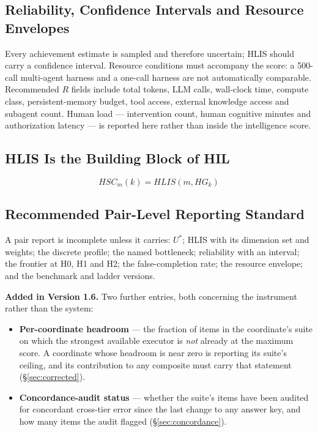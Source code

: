 \documentclass[11pt]{article}
\theoremstyle{definition}
\begin{document}
\subsection{Reliability, Confidence Intervals and Resource Envelopes}\label{sec:resources}

Every achievement estimate is sampled and therefore uncertain; HLIS should carry a confidence interval. Resource conditions must accompany the score: a 500-call multi-agent harness and a one-call harness are not automatically comparable. Recommended $R$ fields include total tokens, LLM calls, wall-clock time, compute class, persistent-memory budget, tool access, external knowledge access and subagent count. Human load --- intervention count, human cognitive minutes and authorization latency --- is reported here rather than inside the intelligence score.

\subsection{HLIS Is the Building Block of HIL}

\begin{equation}
HSC_m(k) = HLIS(m, HG_k)
\end{equation}

\subsection{Recommended Pair-Level Reporting Standard}\label{sec:report}

A pair report is incomplete unless it carries: $U^{*}$; HLIS with its dimension set and weights; the discrete profile; the named bottleneck; reliability with an interval; the frontier at H0, H1 and H2; the false-completion rate; the resource envelope; and the benchmark and ladder versions.

\textbf{Added in Version 1.6.} Two further entries, both concerning the instrument rather than the system:

\begin{itemize}
\item \textbf{Per-coordinate headroom} --- the fraction of items in the coordinate's suite on which the strongest available executor is \emph{not} already at the maximum score. A coordinate whose headroom is near zero is reporting its suite's ceiling, and its contribution to any composite must carry that statement (\S\ref{sec:corrected}).
\item \textbf{Concordance-audit status} --- whether the suite's items have been audited for concordant cross-tier error since the last change to any answer key, and how many items the audit flagged (\S\ref{sec:concordance}).
\end{itemize}
\end{document}
